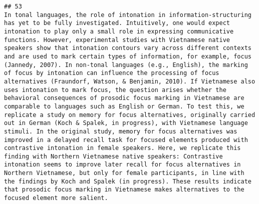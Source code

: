 \documentclass[
  english,
  man]{apa6}
\begin{document}
\begin{verbatim}
## 53                                                                                                                                                                                                                                                                                                                                                                                                                                                                                                                                                                                                                                                                                                                                                                                                                                                                                                                                                                                                                                                                                                     In tonal languages, the role of intonation in information-structuring has yet to be fully investigated. Intuitively, one would expect intonation to play only a small role in expressing communicative functions. However, experimental studies with Vietnamese native speakers show that intonation contours vary across different contexts and are used to mark certain types of information, for example, focus (Jannedy, 2007). In non-tonal languages (e.g., English), the marking of focus by intonation can influence the processing of focus alternatives (Fraundorf, Watson, & Benjamin, 2010). If Vietnamese also uses intonation to mark focus, the question arises whether the behavioral consequences of prosodic focus marking in Vietnamese are comparable to languages such as English or German. To test this, we replicate a study on memory for focus alternatives, originally carried out in German (Koch & Spalek, in progress), with Vietnamese language stimuli. In the original study, memory for focus alternatives was improved in a delayed recall task for focused elements produced with contrastive intonation in female speakers. Here, we replicate this finding with Northern Vietnamese native speakers: Contrastive intonation seems to improve later recall for focus alternatives in Northern Vietnamese, but only for female participants, in line with the findings by Koch and Spalek (in progress). These results indicate that prosodic focus marking in Vietnamese makes alternatives to the focused element more salient.

\end{verbatim}
\end{document}
